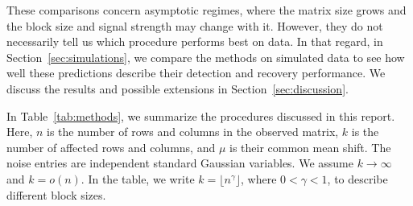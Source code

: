 \documentclass[12pt]{article}
\begin{document}
These comparisons concern asymptotic regimes, where the matrix size
grows and the block size and signal strength may change with it.
However, they do not necessarily tell us which procedure performs best on data. In that regard, in Section~\ref{sec:simulations}, we compare the methods on
simulated data to see how well these predictions describe their
detection and recovery performance. We discuss the results and possible extensions in Section~\ref{sec:discussion}.

In Table~\ref{tab:methods}, we summarize the procedures discussed in this
report. Here, $n$ is the number of rows and columns in the observed
matrix, $k$ is the number of affected rows and columns, and $\mu$ is
their common mean shift. The noise entries are independent standard
Gaussian variables. We assume $k\to\infty$ and $k=o(n)$. In the table, we write $k=\lfloor n^\gamma\rfloor$,
where $0<\gamma<1$, to describe different block sizes.
\clearpage
\end{document}
